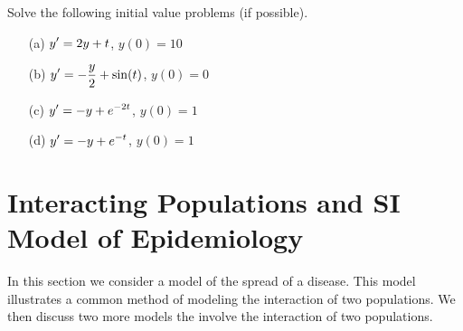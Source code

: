 \begin{exercises}
\begin{exercise}
Solve the following initial value problems (if possible).
\begin{enumerate}
\item[(a)] $\displaystyle y' = 2y+t$, \hspace{0.25cm} $y(0)=10$
\item[(b)] $\displaystyle y' = -\frac{y}{2} + \sin(t)$, \hspace{0.25cm} $y(0)=0$
\item[(c)] $\displaystyle y' = -y + e^{-2t}$, \hspace{0.25cm} $y(0)=1$
\item[(d)] $\displaystyle y' = -y + e^{-t}$, \hspace{0.25cm} $y(0)=1$
\end{enumerate}
\end{exercise}
\end{exercises}


\newpage

\section{Interacting Populations and SI Model of Epidemiology}

In this section we consider a model of the spread of a disease.
This model illustrates a common method of
modeling the interaction of two populations.
We then discuss two more models the involve the
interaction of two populations.


